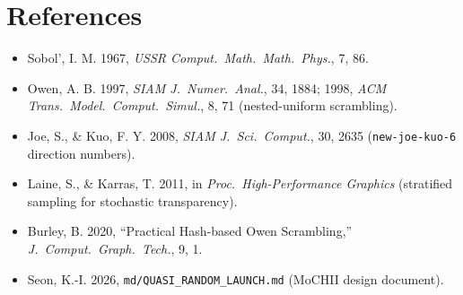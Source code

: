 \documentclass[english,a4paper]{my_memo}
\newcommand{\code}[1]{\texttt{#1}}
\begin{document}
\section*{References}
\begin{itemize}
\item Sobol', I. M. 1967, \textit{USSR Comput.\ Math.\ Math.\ Phys.}, 7, 86.
\item Owen, A. B. 1997, \textit{SIAM J.\ Numer.\ Anal.}, 34, 1884;
      1998, \textit{ACM Trans.\ Model.\ Comput.\ Simul.}, 8, 71
      (nested-uniform scrambling).
\item Joe, S., \& Kuo, F. Y. 2008, \textit{SIAM J.\ Sci.\ Comput.}, 30, 2635
      (\code{new-joe-kuo-6} direction numbers).
\item Laine, S., \& Karras, T. 2011, in \textit{Proc.\ High-Performance
      Graphics} (stratified sampling for stochastic transparency).
\item Burley, B. 2020, ``Practical Hash-based Owen Scrambling,''
      \textit{J.\ Comput.\ Graph.\ Tech.}, 9, 1.
\item Seon, K.-I. 2026, \code{md/QUASI\_RANDOM\_LAUNCH.md} (MoCHII design
      document).
\end{itemize}
\end{document}
